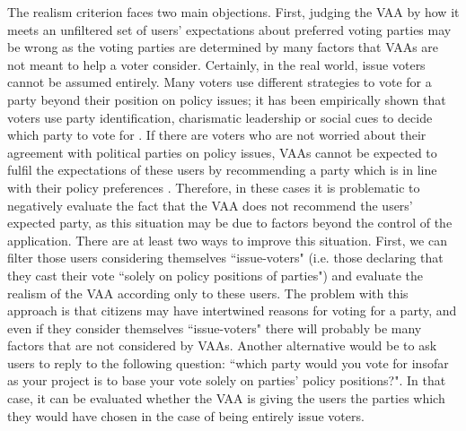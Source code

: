 \documentclass{scrartcl}
\begin{document}
The realism criterion faces two main objections. First, judging the VAA by how it meets an unfiltered set of users' expectations about preferred voting parties may be wrong as the voting parties are determined by many factors that VAAs are not meant to help a voter consider. Certainly, in the real world, issue voters cannot be assumed entirely. Many voters use different strategies to vote for a party beyond their position on policy issues; it has been empirically shown that voters use party identification, charismatic leadership or social cues to decide which party to vote for \cite{Mendez2012}. If there are voters who are not worried about their agreement with political parties on policy issues, VAAs cannot be expected to fulfil the expectations of these users by recommending a party which is in line with their policy preferences \cite{anderson2014matching}. Therefore, in these cases it is problematic to negatively evaluate the fact that the VAA does not recommend the users' expected party, as this situation may be due to factors beyond the control of the application. There are at least two ways to improve this situation. First, we can filter those users considering themselves ``issue-voters" (i.e. those declaring that they cast their vote ``solely on policy positions of parties") and evaluate the realism of the VAA according only to these users. The problem with this approach is that citizens may have intertwined reasons for voting for a party, and even if they consider themselves ``issue-voters" there will probably be many factors that are not considered by VAAs. Another alternative would be to ask users to reply to the following question: ``which party would you vote for insofar as your project is to base your vote solely on parties' policy positions?". In that case, it can be evaluated whether the VAA is giving the users the parties which they would have chosen in the case of being entirely issue voters. \\
\end{document}
